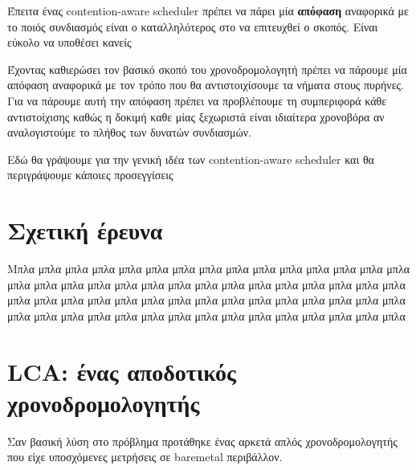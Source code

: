 Έπειτα ένας contention-aware scheduler πρέπει να πάρει μία \textbf{απόφαση}
αναφορικά με το ποιός συνδιασμός είναι ο καταλληλότερος στο να επιτευχθεί ο
σκοπός. Είναι εύκολο να υποθέσει κανείς 

Έχοντας καθιερώσει τον βασικό σκοπό του χρονοδρομολογητή πρέπει να πάρουμε μία
απόφαση αναφορικά με τον τρόπο που θα αντιστοιχίσουμε τα νήματα στους πυρήνες.
Για να πάρουμε αυτή την απόφαση πρέπει να προβλέπουμε τη συμπεριφορά κάθε
αντιστοίχισης καθώς η δοκιμή καθε μίας ξεχωριστά είναι ιδιαίτερα χρονοβόρα αν
αναλογιστούμε το πλήθος των δυνατών συνδιασμών. 


Εδώ θα γράψουμε για την γενική ιδέα των contention-aware scheduler και θα
περιγράψουμε κάποιες προσεγγίσεις



\section{Σχετική έρευνα}
Μπλα μπλα μπλα μπλα μπλα μπλα μπλα μπλα μπλα μπλα μπλα μπλα μπλα μπλα μπλα 
μπλα μπλα μπλα μπλα μπλα μπλα μπλα μπλα μπλα μπλα μπλα μπλα μπλα μπλα μπλα 
μπλα μπλα μπλα μπλα μπλα μπλα μπλα μπλα μπλα μπλα μπλα μπλα μπλα μπλα μπλα 
μπλα μπλα μπλα μπλα μπλα μπλα μπλα μπλα μπλα μπλα μπλα μπλα μπλα μπλα μπλα 
\section{LCA: ένας αποδοτικός χρονοδρομολογητής}
Σαν βασική λύση στο πρόβλημα προτάθηκε ένας αρκετά απλός χρονοδρομολογητής που
είχε υποσχόμενες μετρήσεις σε baremetal περιβάλλον.
